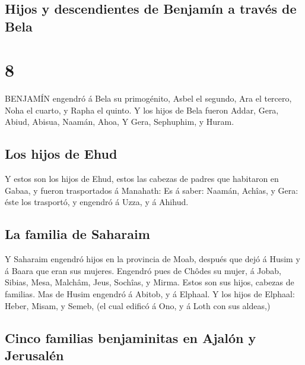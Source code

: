 \hypertarget{hijos-y-descendientes-de-benjamuxedn-a-travuxe9s-de-bela}{%
\subsection{Hijos y descendientes de Benjamín a través de
Bela}\label{hijos-y-descendientes-de-benjamuxedn-a-travuxe9s-de-bela}}

\hypertarget{section-7}{%
\section{8}\label{section-7}}

 BENJAMÍN engendró á Bela su primogénito, Asbel el segundo,
Ara el tercero,  Noha el cuarto, y Rapha el quinto.
 Y los hijos de Bela fueron Addar, Gera, Abiud, 
Abisua, Naamán, Ahoa,  Y Gera, Sephuphim, y Huram.

\hypertarget{los-hijos-de-ehud}{%
\subsection{Los hijos de Ehud}\label{los-hijos-de-ehud}}

 Y estos son los hijos de Ehud, estos las cabezas de padres
que habitaron en Gabaa, y fueron trasportados á Manahath: 
Es á saber: Naamán, Achîas, y Gera: éste los trasportó, y engendró á
Uzza, y á Ahihud.

\hypertarget{la-familia-de-saharaim}{%
\subsection{La familia de Saharaim}\label{la-familia-de-saharaim}}

 Y Saharaim engendró hijos en la provincia de Moab, después
que dejó á Husim y á Baara que eran sus mujeres.  Engendró
pues de Chôdes su mujer, á Jobab, Sibias, Mesa, Malchâm, 
Jeus, Sochîas, y Mirma. Estos son sus hijos, cabezas de familias.
 Mas de Husim engendró á Abitob, y á Elphaal. 
Y los hijos de Elphaal: Heber, Misam, y Semeb, (el cual edificó á Ono, y
á Loth con sus aldeas,)

\hypertarget{cinco-familias-benjaminitas-en-ajaluxf3n-y-jerusaluxe9n}{%
\subsection{Cinco familias benjaminitas en Ajalón y
Jerusalén}\label{cinco-familias-benjaminitas-en-ajaluxf3n-y-jerusaluxe9n}}

